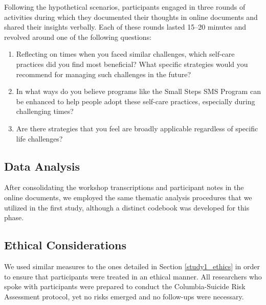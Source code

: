Following the hypothetical scenarios, participants engaged in three rounds of activities during which they documented their thoughts in online documents and shared their insights verbally. Each of these rounds lasted 15--20 minutes and revolved around one of the following questions:

\begin{enumerate}
\item Reflecting on times when you faced similar challenges, which self-care practices did you find most beneficial? What specific strategies would you recommend for managing such challenges in the future?
\item In what ways do you believe programs like the Small Steps SMS Program can be enhanced to help people adopt these self-care practices, especially during challenging times?
\item Are there strategies that you feel are broadly applicable regardless of specific life challenges? %
\end{enumerate}


\subsection{Data Analysis}
After consolidating the workshop transcriptions and participant notes in the online documents, we employed the same thematic analysis procedures that we utilized in the first study, although a distinct codebook was developed for this phase.

\subsection{Ethical Considerations}

We used similar measures to the ones detailed in Section \ref{study1_ethics} in order to ensure that participants were treated in an ethical manner. All researchers who spoke with participants were prepared to conduct the Columbia-Suicide Risk Assessment protocol, yet no risks emerged and no follow-ups were necessary.